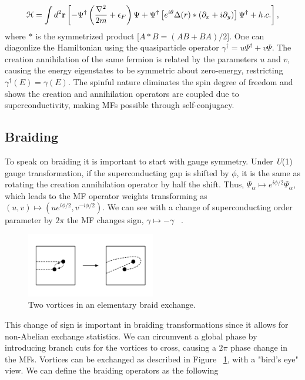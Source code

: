 \begin{equation}
  \mathcal{H} = \int d^2 \mathbf{r} \left[ -\Psi^{\dagger} \left( \dfrac{\nabla^2}{2m} + \epsilon_F \right) \Psi + \Psi^{\dagger} \left[ e^{i\theta} \Delta(r) * \left( \partial_x +i\partial_y \right) \right] \Psi^{\dagger} + h.c. \right],
\end{equation}
where $*$ is the symmetrized product
[$A*B = (AB + BA) / 2$].
One can diagonlize the Hamiltonian using the quasiparticle operator
$\gamma^{\dagger} = u\Psi^{\dagger} + v\Psi$.
The creation annihilation of the same fermion is related by the parameters $u$ and $v$, causing the energy eigenstates to be symmetric about zero-energy, restricting
$\gamma^{\dagger}(E) = \gamma (E)$.
The spinful nature eliminates the spin degree of freedom and shows the creation and annihilation operators are coupled due to superconductivity, making MFs possible through self-conjugacy.

\subsection{Braiding}
To speak on braiding it is important to start with gauge symmetry.
Under \textit{U}(1) gauge transformation, if the superconducting gap is shifted by $\phi$, it is the same as rotating the creation annihilation operator by half the shift.
Thus, $\Psi_{\alpha} \mapsto e^{i\phi/2} \Psi_{\alpha}$, which leads to the MF operator weights transforming as $(u,v) \mapsto (ue^{i\phi/2}, v^{-i\phi/2})$.
We can see with a change of superconducting order parameter by $2\pi$ the MF changes sign, $\gamma \mapsto -\gamma$ ~\cite{ivanovNonAbelianStatisticsHalfQuantum2001}.

\begin{figure}
  \includegraphics[width=0.5\textwidth]{./figures/pwave-braid.pdf}
  \caption{Two vortices in an elementary braid exchange.}
  \label{fig:pwave-braid}
\end{figure}


This change of sign is important in braiding transformations since it allows for non-Abelian exchange statistics.
We can circumvent a global phase by introducing branch cuts for the vortices to cross, causing a $2\pi$ phase change in the MFs.
Vortices can be exchanged as described in Figure ~\ref{fig:pwave-braid}, with a "bird's eye" view.
We can define the braiding operators as the following


